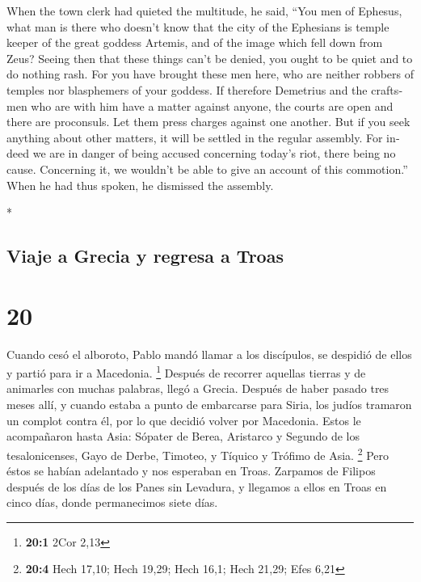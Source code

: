 \begin{paracol}{2}
\begin{otherlanguage}{english}
 When the town clerk had quieted the multitude, he said,
``You men of Ephesus, what man is there who doesn't know that the city
of the Ephesians is temple keeper of the great goddess Artemis, and of
the image which fell down from Zeus?  Seeing then that
these things can't be denied, you ought to be quiet and to do nothing
rash.  For you have brought these men here, who are
neither robbers of temples nor blasphemers of your goddess.
 If therefore Demetrius and the craftsmen who are with
him have a matter against anyone, the courts are open and there are
proconsuls. Let them press charges against one another. 
But if you seek anything about other matters, it will be settled in the
regular assembly.  For indeed we are in danger of being
accused concerning today's riot, there being no cause. Concerning it, we
wouldn't be able to give an account of this commotion.'' 
When he had thus spoken, he dismissed the assembly.

\end{otherlanguage}

\switchcolumn[0]*

\hypertarget{viaje-a-grecia-y-regresa-a-troas}{%
\subsection{Viaje a Grecia y regresa a
Troas}\label{viaje-a-grecia-y-regresa-a-troas}}

\hypertarget{section-38}{%
\section{20}\label{section-38}}

 Cuando cesó el alboroto, Pablo mandó llamar a los
discípulos, se despidió de ellos y partió para ir a Macedonia.
\footnote{\textbf{20:1} 2Cor 2,13}  Después de recorrer
aquellas tierras y de animarles con muchas palabras, llegó a Grecia.
 Después de haber pasado tres meses allí, y cuando estaba
a punto de embarcarse para Siria, los judíos tramaron un complot contra
él, por lo que decidió volver por Macedonia.  Estos le
acompañaron hasta Asia: Sópater de Berea, Aristarco y Segundo de los
tesalonicenses, Gayo de Derbe, Timoteo, y Tíquico y Trófimo de Asia.
\footnote{\textbf{20:4} Hech 17,10; Hech 19,29; Hech 16,1; Hech 21,29;
  Efes 6,21}  Pero éstos se habían adelantado y nos
esperaban en Troas.  Zarpamos de Filipos después de los
días de los Panes sin Levadura, y llegamos a ellos en Troas en cinco
días, donde permanecimos siete días.


\end{paracol}
